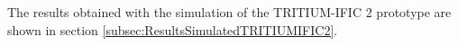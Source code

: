The results obtained with the simulation of the TRITIUM-IFIC 2 prototype are shown in section \ref{subsec:ResultsSimulatedTRITIUMIFIC2}.






